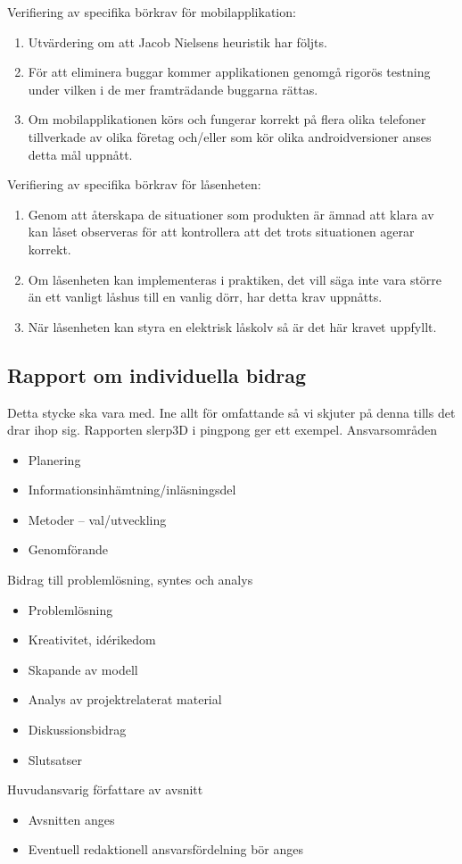 \documentclass[11pt]{article}
\begin{document}
Verifiering av specifika börkrav för mobilapplikation:
\begin{enumerate}
\item Utvärdering om att Jacob Nielsens heuristik har följts.
\item För att eliminera buggar kommer applikationen genomgå rigorös testning under vilken i de mer framträdande buggarna rättas.
\item Om mobilapplikationen körs och fungerar korrekt på flera olika telefoner tillverkade av olika företag och/eller som kör olika
androidversioner anses detta mål uppnått.
\end{enumerate}
Verifiering av specifika börkrav för låsenheten:
\begin{enumerate}
\item Genom att återskapa de situationer som produkten är ämnad att klara av kan låset observeras för att kontrollera att det trots situationen agerar korrekt.
\item Om låsenheten kan implementeras i praktiken, det vill säga inte vara större än ett vanligt låshus till en vanlig dörr, har detta krav uppnåtts.
\item När låsenheten kan styra en elektrisk låskolv så är det här kravet uppfyllt.
\end{enumerate}

\newpage
\subsection*{Rapport om individuella bidrag}
Detta stycke ska vara med. Ine allt för omfattande så vi skjuter på denna tills det drar ihop sig. Rapporten slerp3D i pingpong ger ett exempel.
Ansvarsområden
\begin{itemize}
\item Planering
\item Informationsinhämtning/inläsningsdel
\item Metoder -- val/utveckling
\item Genomförande
\end{itemize}
Bidrag till problemlösning, syntes och analys
\begin{itemize}
\item Problemlösning 
\item Kreativitet, idérikedom
\item Skapande av modell
\item Analys av projektrelaterat material 
\item Diskussionsbidrag
\item Slutsatser
\end{itemize}
Huvudansvarig författare av avsnitt
\begin{itemize}
\item Avsnitten anges
\item Eventuell redaktionell ansvarsfördelning bör anges
\end{itemize}
\end{document}

